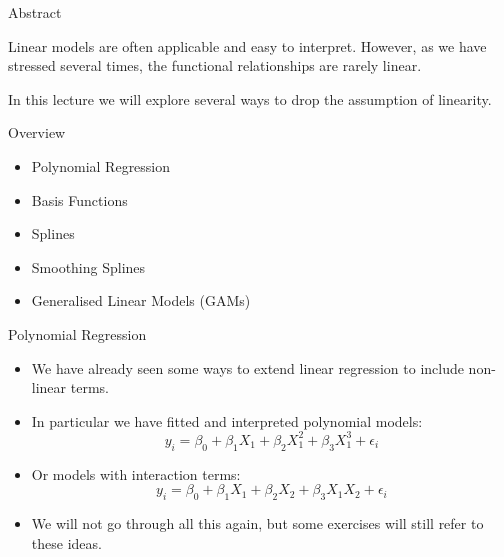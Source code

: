 \documentclass[mathserif, aspectratio=169]{beamer}
\subtitle{\bfseries%
  {Beyond Linearity}\\%
  {\tiny\it Polynomial Regression, Basis Functions, Splines, Generalised Additive Models}\\%
}
\begin{document}


\begin{frame}{Abstract}
	\begin{blurb}
		Linear models are often applicable and easy to interpret. However, as
		we have stressed several times, the  functional relationships
		are rarely linear.

		In this lecture we will explore several ways to drop the assumption
		of linearity.
	\end{blurb}
\end{frame}

\begin{frame}{Overview}
	\begin{itemize}
		\item Polynomial Regression
		\item Basis Functions
		\item Splines
		\item Smoothing Splines
		\item Generalised Linear Models (GAMs)
	\end{itemize}
\end{frame}

\begin{frame}{Polynomial Regression}
	\begin{itemize}
		\item We have already seen some ways to extend linear regression to include
			non-linear terms.
		\item In particular we have fitted and interpreted polynomial models:
			\[
				y_i = \beta_0 + \beta_1 X_1 + \beta_2 X_1^2 + \beta_3 X_1^3 + \epsilon_i
			\]
		\item Or models with interaction terms:
			\[
				y_i = \beta_0 + \beta_1 X_1 + \beta_2 X_2 + \beta_3 X_1 X_2 + \epsilon_i
			\]
		\item We will not go through all this again, but some exercises will still refer
			to these ideas.
	\end{itemize}
\end{frame}
\end{document}
